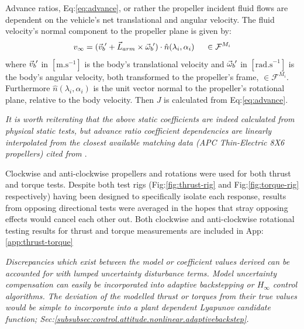\par
Advance ratios, Eq:\ref{eq:advance}, or rather the propeller incident fluid flows are dependent on the vehicle's net translational and angular velocity. The fluid velocity's normal component to the propeller plane is given by:
\begin{equation}\label{eq:normal-fluid}
v_\infty = (\vec{v}_b\hspace{-1pt}' + \vec{L}_{arm}\times \vec{\omega}_b\hspace{-1pt}')\cdot \hat{n}(\lambda_i,\alpha_i)~~~~\in\mathcal{F}^{M_i}
\end{equation}
where $\vec{v}_b\hspace{-1pt}'$ in $[\text{m.s}^{-1}]$ is the body's translational velocity and $\vec{\omega}_b\hspace{-1pt}'$ in $[\text{rad.s}^{-1}]$ is the body's angular velocity, both transformed to the propeller's frame, $\in\mathcal{F}^{M_i}$. Furthermore $\hat{n}(\lambda_i,\alpha_i)$ is the unit vector normal to the propeller's rotational plane, relative to the body velocity. Then $J$ is calculated from Eq:\ref{eq:advance}.
\par
{\color{Gray}\emph{It is worth reiterating that the above static coefficients are indeed calculated from physical static tests, but advance ratio coefficient dependencies are linearly interpolated from the closest available matching data (APC Thin-Electric 8X6 propellers) cited from \cite{UIUC}}.}
\par
Clockwise and anti-clockwise propellers and rotations were used for both thrust and torque tests. Despite both test rigs  (Fig:\ref{fig:thrust-rig} and Fig:\ref{fig:torque-rig} respectively) having been designed to specifically isolate each response, results from opposing directional tests were averaged in the hopes that stray opposing effects would cancel each other out. Both clockwise and anti-clockwise rotational testing  results for thrust and torque measurements are included in App:\ref{app:thrust-torque}
\par
{\color{Gray}\emph{Discrepancies which exist between the model or coefficient values derived can be accounted for with lumped uncertainty disturbance terms. Model uncertainty compensation can easily be incorporated into adaptive backstepping or $H_\infty$ control algorithms. The deviation of the modelled thrust or torques from their true values would be simple to incorporate into a plant dependent Lyapunov candidate function; Sec:\ref{subsubsec:control.attitude.nonlinear.adaptivebackstep}.}}
